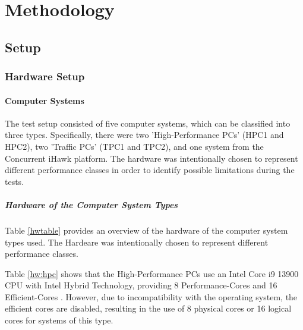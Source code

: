 \chapter{Methodology}

\section{Setup}
\subsection{Hardware Setup}

\subsubsection{Computer Systems}
The test setup consisted of five computer systems, which can be classified into three types.  Specifically, there were two 'High-Performance PCs' (HPC1 and HPC2), two 'Traffic PCs' (TPC1 and TPC2), and one system from the Concurrent iHawk platform. The hardware was intentionally chosen to represent different performance classes in order to identify possible limitations during the tests. 

\paragraph{Hardware of the Computer System Types} \label{chap:ComputerHardware}
Table \ref{hwtable} provides an overview of the hardware of the computer system types used. The Hardeare was intentionally chosen to represent different performance classes.

Table \ref{hw:hpc} shows that the High-Performance PCs use an Intel Core i9 13900 CPU with Intel Hybrid Technology, providing 8 Performance-Cores and 16 Efficient-Cores \cite{setup10}. However, due to incompatibility with the operating system, the efficient cores are disabled, resulting in the use of 8 physical cores or 16 logical cores for systems of this type.

